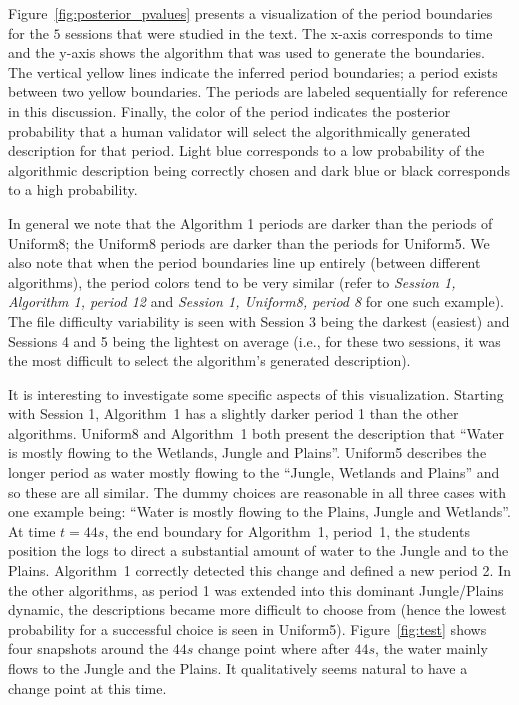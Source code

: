 \begin{appendices}
Figure~\ref{fig:posterior_pvalues} presents a visualization of the period boundaries for the $5$ sessions that were studied in the text. The x-axis corresponds to time and the y-axis shows the algorithm that was used to generate the boundaries. The vertical yellow lines indicate the inferred period boundaries; a period exists between two yellow boundaries. The periods are labeled sequentially for reference in this discussion. Finally, the color of the period indicates the posterior probability that a human validator will select the algorithmically generated description for that period. Light blue corresponds to a low probability of the algorithmic description being correctly chosen and dark blue or black corresponds to a high probability.

In general we note that the Algorithm 1 periods are darker than the periods of Uniform8; the Uniform8 periods are darker than the periods for Uniform5. We also note that when the period boundaries line up entirely (between different algorithms), the period colors tend to be very similar (refer to \textit{Session 1, Algorithm 1, period 12} and \textit{Session 1, Uniform8, period 8} for one such example). The file difficulty variability is seen with Session 3 being the darkest (easiest) and Sessions 4 and 5 being the lightest on average (i.e., for these two sessions, it was the most difficult to select the algorithm's generated description).

It is interesting to investigate some specific aspects of this visualization. Starting with Session 1, Algorithm~1 has a slightly darker period 1 than the other algorithms. Uniform8 and Algorithm~1 both present the description that ``Water is mostly flowing to the Wetlands, Jungle and Plains''. Uniform5 describes the longer period as water mostly flowing to the ``Jungle, Wetlands and Plains'' and so these are all similar. The dummy choices are reasonable in all three cases with one example being: ``Water is mostly flowing to the Plains, Jungle and Wetlands''. At time $t=44s$, the end boundary for Algorithm~1, period~1, the students position the logs to direct a substantial amount of water to the Jungle and to the Plains. Algorithm~1 correctly detected this change and defined a new period 2. In the other algorithms, as period 1 was extended into this dominant Jungle/Plains dynamic, the descriptions became more difficult to choose from (hence the lowest probability for a successful choice is seen in Uniform5). Figure~\ref{fig:test} shows four snapshots around the $44s$ change point where after $44s$, the water mainly flows to the Jungle and the Plains. It qualitatively seems natural to have a change point at this time.


\end{appendices}

